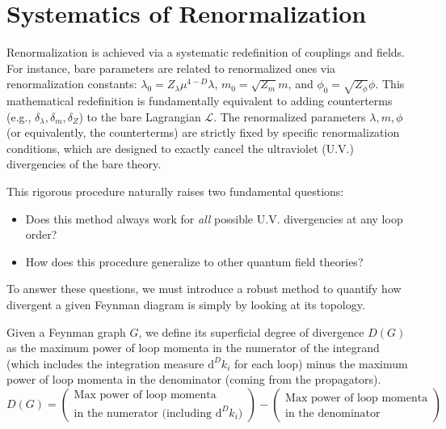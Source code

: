 \section{Systematics of Renormalization}

Renormalization is achieved via a systematic redefinition of couplings and fields. For instance, bare parameters are related to renormalized ones via renormalization constants: $\lambda_0 = Z_\lambda \mu^{4-D} \lambda$, $m_0 = \sqrt{Z_m} m$, and $\phi_0 = \sqrt{Z_\phi} \phi$. This mathematical redefinition is fundamentally equivalent to adding counterterms (e.g., $\delta_\lambda, \delta_m, \delta_Z$) to the bare Lagrangian $\mathcal{L}$. The renormalized parameters $\lambda, m, \phi$ (or equivalently, the counterterms) are strictly fixed by specific renormalization conditions, which are designed to exactly cancel the ultraviolet (U.V.) divergencies of the bare theory.

This rigorous procedure naturally raises two fundamental questions:
\begin{itemize}
    \item Does this method always work for \textit{all} possible U.V. divergencies at any loop order?
    \item How does this procedure generalize to other quantum field theories?
\end{itemize}

To answer these questions, we must introduce a robust method to quantify how divergent a given Feynman diagram is simply by looking at its topology.

\begin{definition}
    Given a Feynman graph $G$, we define its superficial degree of divergence $D(G)$ as the maximum power of loop momenta in the numerator of the integrand (which includes the integration measure $\mathrm{d}^D k_i$ for each loop) minus the maximum power of loop momenta in the denominator (coming from the propagators).
    \[
        D(G) = \left( \begin{matrix} \text{Max power of loop momenta} \\ \text{in the numerator (including } \mathrm{d}^D k_i) \end{matrix} \right) - \left( \begin{matrix} \text{Max power of loop momenta} \\ \text{in the denominator} \end{matrix} \right)
    \]
\end{definition}

